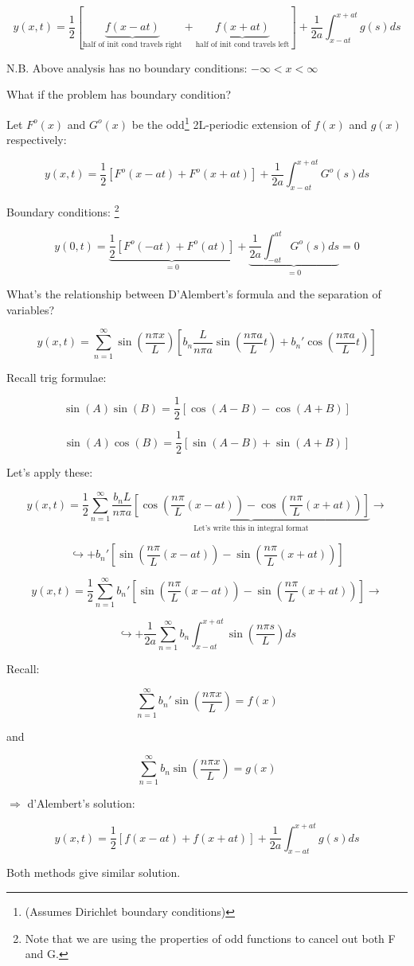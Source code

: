 \begin{equation}
    y(x,t) = \frac{1}{2} \left[ \underbrace{f(x-at)}_{\text{half of init  cond travels right}} + \underbrace{f(x+at)}_{\text{half of init cond travels left}} \right] + \frac{1}{2a} \int_{x-at}^{x+at} g(s) ds
\end{equation}

N.B. Above analysis has no boundary conditions: $-\infty < x < \infty$

\hfill

What if the problem has boundary condition?

Let $F^o (x)$ and $G^o (x)$ be the odd\footnote{ (Assumes Dirichlet boundary conditions)} 2L-periodic extension of $f(x)$ and $g(x)$ respectively:

$$y(x,t) = \frac{1}{2} \left[ F^o (x-at) + F^o (x+at) \right] + \frac{1}{2a} \int_{x-at}^{x+at} G^o (s) ds$$

Boundary conditions: \footnote{Note that we are using the properties of odd functions to cancel out both F and G. }

$$y(0,t) = \underbrace{ \frac{1}{2} \left[ F^o (-at) + F^o (at) \right]}_{=0} + \underbrace{\frac{1}{2a} \int_{-at}^{at} G^o (s) ds}_{ = 0} = 0$$

What's the relationship between D'Alembert's formula and the separation of variables?

$$y(x,t) = \sum_{n = 1}^\infty \sin \left( \frac{n \pi x}{L} \right) \left[ b_n \frac{L}{n \pi a} \sin \left( \frac{n \pi a}{L}  t\right) + b_n' \cos \left( \frac{n \pi a}{L} t \right) \right]$$

Recall trig formulae:

$$\sin(A) \sin(B) = \frac{1}{2} \left[ \cos(A-B) - \cos(A+B) \right]$$

$$\sin(A) \cos(B) = \frac{1}{2} \left[ \sin(A-B) + \sin(A+B) \right]$$

Let's apply these:

$$y(x,t) = \frac{1}{2} \sum_{n  =1}^\infty \frac{b_n L}{n \pi a} \underbrace{\left[ \cos \left( \frac{n \pi}{L} (x-at) \right) - \cos \left( \frac{n \pi}{L} (x+at) \right) \right]}_{\text{Let's write this in integral format}} \rightarrow$$

$$\hookrightarrow + b_n' \left[ \sin \left( \frac{n \pi}{L} (x-at) \right) - \sin \left( \frac{n \pi}{L} (x+at) \right) \right]$$

$$y(x,t) = \frac{1}{2} \sum_{n = 1}^\infty b_n' \left[ \sin \left( \frac{n \pi}{L} (x-at) \right) - \sin \left( \frac{n \pi}{L} (x+at) \right) \right] \rightarrow$$

$$ \hookrightarrow + \frac{1}{2a} \sum_{n = 1}^\infty b_n \int_{x - at}^{x+at} \sin \left( \frac{n \pi s}{L} \right) ds$$

Recall: 

$$\sum_{n = 1}^\infty b_n' \sin(\frac{n \pi x}{L}) = f(x)$$

and

$$\sum_{n  =1}^\infty b_n \sin \left( \frac{n \pi x}{L} \right) = g(x)$$

$\Rightarrow$ d'Alembert's solution:

$$y(x,t) = \frac{1}{2} \left[ f(x-at) + f(x+at) \right] + \frac{1}{2a} \int_{x-at}^{x+at} g(s) ds$$

Both methods give similar solution. 